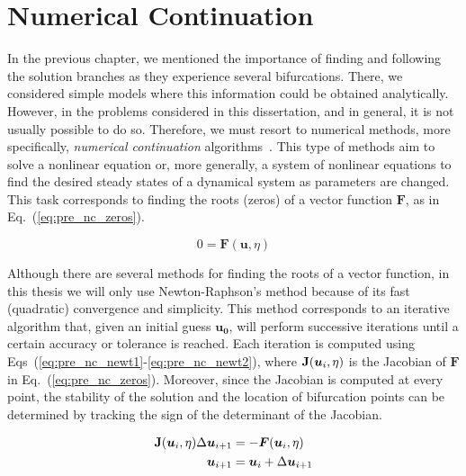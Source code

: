 \chapter{Numerical Continuation}

\label{ch:continuation}

In the previous chapter, we mentioned the importance of finding and following
the solution branches as they experience several bifurcations. There, we considered simple
models where this information could be obtained analytically. However, in the problems considered
in this dissertation, and in general, it is not usually possible to do so. Therefore,
we must resort to numerical methods, more specifically, 
{\em numerical continuation} algorithms~\cite{seydel2009practical}. This type of methods
aim to solve a nonlinear equation or, more generally, a system of nonlinear 
equations to find the desired steady states of a dynamical system 
as parameters are changed. This task corresponds to finding the roots 
(zeros) of a vector function $\bm{F}$, as in Eq.~(\ref{eq:pre_nc_zeros}). 


\begin{equation}
    0 = \bm{F}(\bm{u}, \eta)
    \label{eq:pre_nc_zeros}
\end{equation}

Although there are several methods for finding the roots of a vector function,
in this thesis we will only use Newton-Raphson's method because of its fast 
(quadratic) convergence and simplicity. This method corresponds to an 
iterative algorithm that, given an initial guess $\bm{u_0}$, will perform 
successive iterations until a certain accuracy or tolerance is reached. 
Each iteration is computed using Eqs~(\ref{eq:pre_nc_newt1}-\ref{eq:pre_nc_newt2}),
where $\mathbf{J}(\bm{u}_i, \eta)$ is the Jacobian of $\bm{F}$ in Eq.~(\ref{eq:pre_nc_zeros}). 
Moreover, since the Jacobian is computed at every point, the stability 
of the solution and the location of bifurcation points can be determined
by tracking the sign of the determinant of the Jacobian.

\begin{align}
    \mathbf{J}(\bm{u}_i, \eta) \Delta \bm{u}_{i+1} &= - \bm{F}(\bm{u}_i, \eta) 
    \label{eq:pre_nc_newt1}
    \\
    \bm{u}_{i+1} &= \bm{u}_i + \Delta \bm{u}_{i+1}
    \label{eq:pre_nc_newt2}
\end{align}

